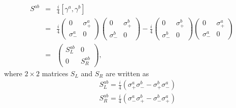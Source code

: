 \documentclass[11pt]{article}
\begin{document}
\section{ }
\begin{eqnarray}
S^{ab}&=&\frac{i}{4}[\gamma^a,\gamma^b]\\ &=&\frac{i}{4}
  \begin{pmatrix}
    0 & \sigma_+^a \\
    \sigma_-^a & 0
  \end{pmatrix}
  \begin{pmatrix}
    0 & \sigma_+^b \\
    \sigma_-^b & 0
  \end{pmatrix}
  -\frac{i}{4}
  \begin{pmatrix}
    0 & \sigma_+^b \\
    \sigma_-^b & 0
  \end{pmatrix}
  \begin{pmatrix}
    0 & \sigma_+^a \\
    \sigma_-^a & 0
  \end{pmatrix}\\
  &=& 
  \begin{pmatrix}
    S_L^{ab} & 0 \\
    0 & S_R^{ab}
  \end{pmatrix},
\end{eqnarray}
where $2\times 2$ matrices $S_L$ and $S_R$ are written as
\begin{eqnarray}
 && S_L^{ab} = \frac{i}{4} ( \sigma_+^a \sigma_-^b - \sigma_+^b \sigma_-^a )\\
 && S_R^{ab} = \frac{i}{4} ( \sigma_-^a \sigma_+^b - \sigma_-^b \sigma_+^a )
\end{eqnarray}
\end{document}
